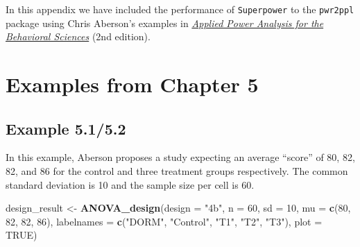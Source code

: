 \documentclass[]{book}
\newenvironment{Shaded}{\begin{snugshade}}{\end{snugshade}}
\newcommand{\DataTypeTok}[1]{\textcolor[rgb]{0.13,0.29,0.53}{#1}}
\newcommand{\DecValTok}[1]{\textcolor[rgb]{0.00,0.00,0.81}{#1}}
\newcommand{\KeywordTok}[1]{\textcolor[rgb]{0.13,0.29,0.53}{\textbf{#1}}}
\newcommand{\NormalTok}[1]{#1}
\newcommand{\OtherTok}[1]{\textcolor[rgb]{0.56,0.35,0.01}{#1}}
\newcommand{\StringTok}[1]{\textcolor[rgb]{0.31,0.60,0.02}{#1}}
\begin{document}
In this appendix we have included the performance of \texttt{Superpower} to the \texttt{pwr2ppl} package using Chris Aberson's examples in \href{https://www.crcpress.com/Applied-Power-Analysis-for-the-Behavioral-Sciences-2nd-Edition/Aberson/p/book/9781138044593}{\emph{Applied Power Analysis for the Behavioral Sciences}} (2nd edition).

\hypertarget{examples-from-chapter-5}{%
\section{Examples from Chapter 5}\label{examples-from-chapter-5}}

\hypertarget{example-5.15.2}{%
\subsection{Example 5.1/5.2}\label{example-5.15.2}}

In this example, Aberson proposes a study expecting an average ``score'' of 80, 82, 82, and 86 for the control and three treatment groups respectively. The common standard deviation is 10 and the sample size per cell is 60.

\begin{Shaded}
\begin{Highlighting}[]
\NormalTok{design_result <-}\StringTok{ }\KeywordTok{ANOVA_design}\NormalTok{(}\DataTypeTok{design =} \StringTok{"4b"}\NormalTok{,}
                              \DataTypeTok{n =} \DecValTok{60}\NormalTok{,}
                              \DataTypeTok{sd =} \DecValTok{10}\NormalTok{,}
                              \DataTypeTok{mu =} \KeywordTok{c}\NormalTok{(}\DecValTok{80}\NormalTok{, }\DecValTok{82}\NormalTok{, }\DecValTok{82}\NormalTok{, }\DecValTok{86}\NormalTok{),}
                              \DataTypeTok{labelnames =} \KeywordTok{c}\NormalTok{(}\StringTok{"DORM"}\NormalTok{,}
                              \StringTok{"Control"}\NormalTok{,}
                              \StringTok{"T1"}\NormalTok{,}
                              \StringTok{"T2"}\NormalTok{,}
                              \StringTok{"T3"}\NormalTok{),}
                              \DataTypeTok{plot =} \OtherTok{TRUE}\NormalTok{)}
\end{Highlighting}
\end{Shaded}
\end{document}
